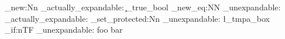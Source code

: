 \cs_new:Nn
  \example_actually_expandable:
  { \c_true_bool }
\cs_new_eq:NN
  \example_unexpandable:
  \example_actually_expandable:
\cs_set_protected:Nn
  \example_unexpandable:
  { \l_tmpa_box }
\bool_if:nTF
  { \example_unexpandable: }  %
  { foo }
  { bar }
